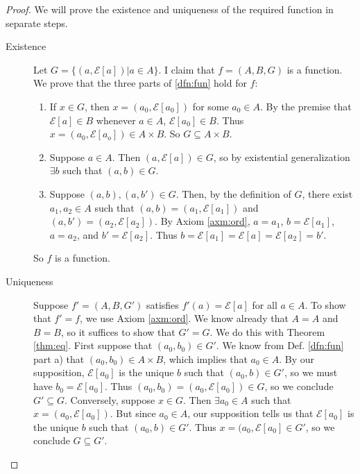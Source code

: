 \documentclass[12pt]{article}
\begin{document}
\begin{proof} We will prove the existence and uniqueness of the required function in separate steps.
  \begin{description}
    \item[Existence] Let $G=\{(a,\mathcal{E}[a])|a\in A\}$.  I claim
      that $f=(A,B,G)$ is a function.  We prove that the three parts
      of \ref{dfn:fun} hold for $f$:
      \begin{enumerate}[label=\alph*)]
        \item If $x\in G$, then $x=(a_0,\mathcal{E}[a_0])$ for some
          $a_0\in A$.  By the premise that $\mathcal{E}[a]\in B$
          whenever $a\in A$, $\mathcal{E}[a_0]\in B$.  Thus
          $x=(a_0,\mathcal{E}[a_o])\in A\times B$.  So $G\subseteq A\times B$.
        \item Suppose $a\in A$.  Then $(a,\mathcal{E}[a])\in G$,
          so by existential generalization $\exists b$ such that
          $(a,b)\in G$.
        \item Suppose $(a,b),(a,b')\in G$.  Then, by the definition of
          $G$, there exist $a_1, a_2\in A$ such that
          $(a,b)=(a_1,\mathcal{E}[a_1])$ and
          $(a,b')=(a_2,\mathcal{E}[a_2])$.  By Axiom \ref{axm:ord},
          $a=a_1$, $b=\mathcal{E}[a_1]$, $a=a_2$, and
          $b'=\mathcal{E}[a_2]$.  Thus
          $b=\mathcal{E}[a_1]=\mathcal{E}[a]=\mathcal{E}[a_2]=b'$.
      \end{enumerate}
      So $f$ is a function.
    \item[Uniqueness] Suppose $f'=(A,B,G')$ satisfies
      $f'(a)=\mathcal{E}[a]$ for all $a\in A$.  To show that $f'=f$,
      we use Axiom \ref{axm:ord}.  We know already that $A=A$ and
      $B=B$, so it suffices to show that $G'=G$.  We do this with
      Theorem \ref{thm:eq}.  First suppose that $(a_0,b_0)\in G'$.  We
      know from Def. \ref{dfn:fun} part a) that $(a_0,b_0)\in A\times
      B$, which implies that $a_0\in A$.  By our supposition,
      $\mathcal{E}[a_0]$ is the unique $b$ such that $(a_0,b)\in G'$,
      so we must have $b_0=\mathcal{E}[a_0]$.  Thus
      $(a_0,b_0)=(a_0,\mathcal{E}[a_0])\in G$, so we conclude
      $G'\subseteq G$.  Conversely, suppose $x\in G$.  Then $\exists
      a_0\in A$ such that $x=(a_0,\mathcal{E}[a_0])$.  But since $a_0
      \in A$, our supposition tells us that $\mathcal{E}[a_0]$ is the
      unique $b$ such that $(a_0,b)\in G'$.  Thus
      $x=(a_0,\mathcal{E}[a_0]\in G'$, so we conclude $G\subseteq G'$.
  \end{description}
\end{proof}
\end{document}
